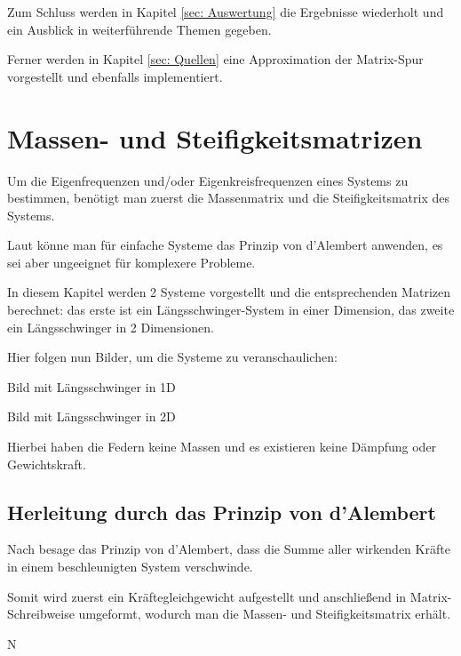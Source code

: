 \documentclass[ngerman,BCOR=4mm]{tudscrreprt}
\theoremstyle{plain} %
\theoremstyle{definition} %
\theoremstyle{remark}
\begin{document}
      Zum Schluss werden in Kapitel \ref{sec: Auswertung} die Ergebnisse wiederholt und ein Ausblick in weiterführende Themen gegeben.

      Ferner werden in Kapitel \ref{sec: Quellen} eine Approximation der Matrix-Spur vorgestellt und ebenfalls implementiert.

\chapter{Massen- und Steifigkeitsmatrizen}
\label{sec: MS Matrizen}
      Um die Eigenfrequenzen und/oder Eigenkreisfrequenzen \w eines Systems zu bestimmen, benötigt man zuerst die Massenmatrix \M und die Steifigkeitsmatrix \K des Systems.

      Laut \cite[S. 366]{maschinendynamikDresig} könne man für einfache Systeme das Prinzip von d'Alembert anwenden, es sei aber ungeeignet für komplexere Probleme.
            
      In diesem Kapitel werden 2 Systeme vorgestellt und die entsprechenden Matrizen berechnet:
      das erste ist ein Längsschwinger-System in einer Dimension, das zweite ein Längsschwinger in 2 Dimensionen.

      Hier folgen nun Bilder, um die Systeme zu veranschaulichen:

      Bild mit Längsschwinger in 1D

      Bild mit Längsschwinger in 2D

      Hierbei haben die Federn keine Massen und es existieren keine Dämpfung oder Gewichtskraft.

      \section{Herleitung durch das Prinzip von d'Alembert}
            Nach \cite{d_AlembertPrinzip} besage das Prinzip von d'Alembert, dass die Summe aller wirkenden Kräfte in einem beschleunigten System verschwinde.

            Somit wird zuerst ein Kräftegleichgewicht aufgestellt und anschließend in Matrix-Schreibweise umgeformt, wodurch man die Massen- und Steifigkeitsmatrix erhält.

            N
            
\end{document}
